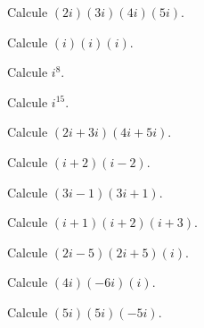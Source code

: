 \begin{ejercicio}
Calcule $\displaystyle (2i)(3i)(4i)(5i)$.
\end{ejercicio}

\begin{ejercicio}
Calcule $\displaystyle (i)(i)(i)$.
\end{ejercicio}

\begin{ejercicio}
Calcule $\displaystyle i^8$.
\end{ejercicio}

\begin{ejercicio}
Calcule $\displaystyle i^{15}$.
\end{ejercicio}

\begin{ejercicio}
Calcule $\displaystyle (2i+3i)(4i+5i)$.
\end{ejercicio}

\begin{ejercicio}
Calcule $\displaystyle (i+2)(i-2)$.
\end{ejercicio}

\begin{ejercicio}
Calcule $\displaystyle (3i-1)(3i+1)$.
\end{ejercicio}

\begin{ejercicio}
Calcule $\displaystyle (i+1)(i+2)(i+3)$.
\end{ejercicio}

\begin{ejercicio}
Calcule $\displaystyle (2i-5)(2i+5)(i)$.
\end{ejercicio}

\begin{ejercicio}
Calcule $\displaystyle (4i)(-6i)(i)$.
\end{ejercicio}

\begin{ejercicio}
Calcule $\displaystyle (5i)(5i)(-5i)$.
\end{ejercicio}

